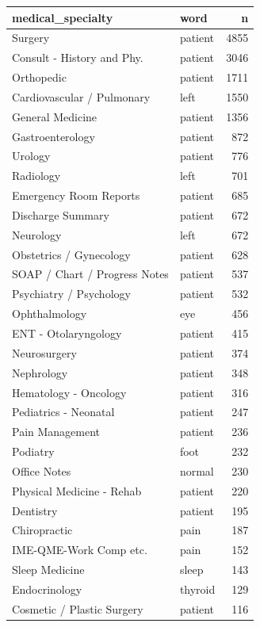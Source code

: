 \documentclass[
]{article}
\begin{document}
\begin{table}
\centering
\begin{tabular}{l|l|r}
\hline
medical\_specialty & word & n\\
\hline
Surgery & patient & 4855\\
\hline
Consult - History and Phy. & patient & 3046\\
\hline
Orthopedic & patient & 1711\\
\hline
Cardiovascular / Pulmonary & left & 1550\\
\hline
General Medicine & patient & 1356\\
\hline
Gastroenterology & patient & 872\\
\hline
Urology & patient & 776\\
\hline
Radiology & left & 701\\
\hline
Emergency Room Reports & patient & 685\\
\hline
Discharge Summary & patient & 672\\
\hline
Neurology & left & 672\\
\hline
Obstetrics / Gynecology & patient & 628\\
\hline
SOAP / Chart / Progress Notes & patient & 537\\
\hline
Psychiatry / Psychology & patient & 532\\
\hline
Ophthalmology & eye & 456\\
\hline
ENT - Otolaryngology & patient & 415\\
\hline
Neurosurgery & patient & 374\\
\hline
Nephrology & patient & 348\\
\hline
Hematology - Oncology & patient & 316\\
\hline
Pediatrics - Neonatal & patient & 247\\
\hline
Pain Management & patient & 236\\
\hline
Podiatry & foot & 232\\
\hline
Office Notes & normal & 230\\
\hline
Physical Medicine - Rehab & patient & 220\\
\hline
Dentistry & patient & 195\\
\hline
Chiropractic & pain & 187\\
\hline
IME-QME-Work Comp etc. & pain & 152\\
\hline
Sleep Medicine & sleep & 143\\
\hline
Endocrinology & thyroid & 129\\
\hline
Cosmetic / Plastic Surgery & patient & 116\\

\end{tabular}
\end{table}
\end{document}
